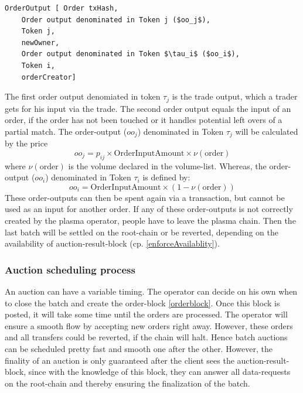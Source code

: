\documentclass[11pt,parskip=full]{scrartcl}%
\begin{document}
\begin{lstlisting}
OrderOutput [ Order txHash,
    Order output denominated in Token j ($oo_j$), 
    Token j,
    newOwner,
    Order output denominated in Token $\tau_i$ ($oo_i$),
    Token i,
    orderCreator]

\end{lstlisting}
The first order output denomiated in token $\tau_j$ is the trade output, which a trader gets for his input via the trade. 
The second order output equals the input of an order, if the order has not been touched or it handles potential left overs of a partial match.
The order-output ($oo_j$) denominated in Token $\tau_j$ will be calculated by the price 
\begin{equation}
  oo_j = p_{ij} \times \text{OrderInputAmount} \times \nu(\text{order}) 
    \label{fee_equ}
\end{equation}
where $\nu(\text{order})$ is the volume declared in the volume-list.  
Whereas, the order-output ($oo_i$) denominated in Token $\tau_i$ is defined by:
\begin{equation}
  oo_i =  \text{OrderInputAmount}\times (1 - \nu(\text{order}))
\end{equation}
These order-outputs can then be spent again via a transaction, but cannot be used as an input for another order. 
If any of these order-outputs is not correctly created by the plasma operator, people have to leave the plasma chain. 
Then the last batch will be settled on the root-chain or be reverted, depending on the availability of auction-result-block (cp. \ref{enforceAvailablity}). 



\subsubsection{Auction scheduling process}

An auction can have a variable timing. 
The operator can decide on his own when to close the batch and create the order-block \ref{orderblock}. 
Once this block is posted, it will take some time until the orders are processed. 
The operator will ensure a smooth flow by accepting new orders right away. 
However, these orders and all transfers could be reverted, if the chain will halt. 
Hence batch auctions can be scheduled pretty fast and smooth one after the other. 
However, the finality of an auction is only guaranteed after the client sees the auction-result-block, since with the knowledge of this block, they can answer all data-requests on the root-chain and thereby ensuring the finalization of the batch.
\end{document}

